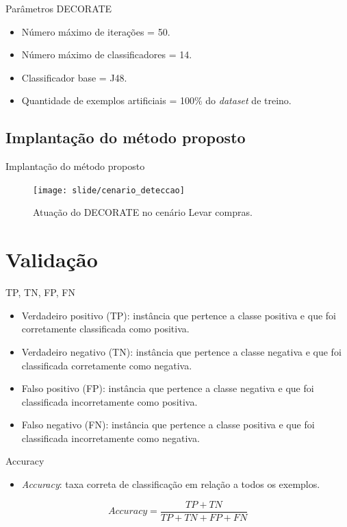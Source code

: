 \documentclass[brazil]{beamer}
\begin{document}
\begin{frame}{Parâmetros DECORATE \cite{Melville:2004}}
   \begin{itemize}
\justifying
      \item <1 ->Número máximo de iterações = 50.
      \item <2 ->Número máximo de classificadores = 14.
      \item <3 ->Classificador base = J48. 
      \item <4 ->Quantidade de exemplos artificiais = 100\% do \textit{dataset} de treino.
   \end{itemize}
\end{frame}


\subsection{Implantação do método proposto}
\begin{frame}{Implantação do método proposto}
\begin{figure}[!htb] \centering 
  \centering
  \texttt{[image: slide/cenario\_deteccao]} 
  \caption{Atuação do DECORATE no cenário Levar compras.} 
  \label{fig:cenario_deteccao}
\end{figure}
\end{frame}


\section{Validação}
\begin{frame}{TP, TN, FP, FN \cite{Olson:2008}}
   \begin{itemize}
      \item <1 ->Verdadeiro positivo (TP): instância que pertence a classe positiva e que foi corretamente classificada como positiva.
      \item <2 ->Verdadeiro negativo (TN): instância que pertence a classe negativa e que foi classificada corretamente como negativa.
      \item <3 ->Falso positivo (FP): instância que pertence a classe negativa e que foi classificada  incorretamente como positiva.
      \item <4 ->Falso negativo (FN): instância que pertence a classe positiva e que foi classificada incorretamente como negativa.
\justifying
   \end{itemize}
\end{frame}

\begin{frame}{Accuracy \cite{Metz:1978}}
   \begin{itemize}
\justifying
     \item \textit{Accuracy}: taxa correta de classificação em relação a todos os exemplos. 
   \end{itemize}
\vspace{0.3in}
\begin{equation} 
  Accuracy = \frac{TP+TN}{TP+TN+FP+FN} 
  \label{eq:accuracy}
\end{equation}
\end{frame}
\end{document}
